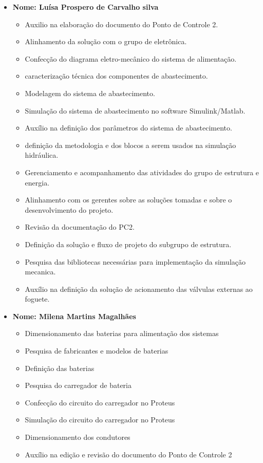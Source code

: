 \begin{itemize}
    \item \textbf{Nome: Luísa Prospero de Carvalho silva}
    \begin{itemize} 
     \item Auxilio na elaboração do documento do Ponto de Controle 2.
     \item Alinhamento da solução com o grupo de eletrônica.
     \item Confecção do diagrama eletro-mecânico do sistema de alimentação.
     \item caracterização técnica dos componentes de abastecimento.
     \item Modelagem do sistema de abastecimento. 
     \item Simulação do sistema de abastecimento no software Simulink/Matlab.
     \item Auxílio na definição dos parâmetros do sistema de abastecimento.
     \item definição da metodologia e dos blocos a serem usados na simulação hidráulica.
     \item Gerenciamento e acompanhamento das atividades do grupo de estrutura e energia.
     \item Alinhamento com os gerentes sobre as soluções tomadas e sobre o desenvolvimento do projeto.
     \item Revisão da documentação do PC2.
    
    
    
   
    \item Definição da solução e fluxo de projeto do subgrupo de estrutura.
   \item Pesquisa das bibliotecas necessárias para implementação da simulação mecanica.
   \item Auxílio na definição da solução de acionamento das válvulas externas ao foguete.
        
   \end{itemize}
    
    \item \textbf{Nome: Milena Martins Magalhães}
    \begin{itemize}
	\item Dimensionamento das baterias para alimentação dos sistemas
	\item Pesquisa de fabricantes e modelos de baterias
	\item Definição das baterias
	\item Pesquisa do carregador de bateria
	\item Confecção do circuito do carregador no Proteus
	\item Simulação do circuito do carregador no Proteus
	\item Dimensionamento dos condutores 
	\item Auxílio na edição e revisão do documento do Ponto de Controle 2 
    \end{itemize}
    

\end{itemize}
